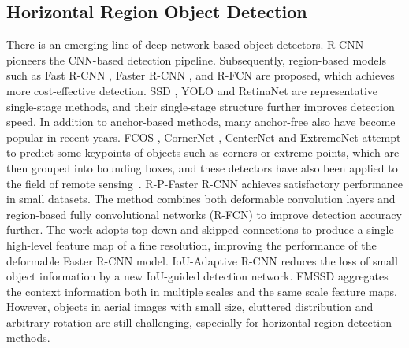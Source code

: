 \documentclass[10pt,journal,compsoc]{IEEEtran}
\begin{document}
\subsection{Horizontal Region Object Detection}
There is an emerging line of deep network based object detectors. R-CNN \cite{girshick2014rich} pioneers the CNN-based detection pipeline. Subsequently, region-based models such as Fast R-CNN \cite{girshick2015fast}, Faster R-CNN \cite{ren2017faster}, and R-FCN \cite{dai2016r} are proposed, which achieves more cost-effective detection. SSD \cite{liu2016ssd}, YOLO \cite{redmon2016you} and RetinaNet \cite{lin2017focal} are representative single-stage methods, and their single-stage structure further improves detection speed. In addition to anchor-based methods, many anchor-free also have become popular in recent years. FCOS \cite{tian2019fcos}, CornerNet \cite{law2018cornernet}, CenterNet \cite{duan2019centernet} and ExtremeNet \cite{zhou2019bottom} attempt to predict some keypoints of objects such as corners or extreme points, which are then grouped into bounding boxes, and these detectors have also been applied to the field of remote sensing~\cite{wei2020oriented,xiao2020axis}. R-P-Faster R-CNN \cite{han2017efficient} achieves satisfactory performance in small datasets. The method \cite{xu2017deformable} combines both deformable convolution layers \cite{dai2017deformable} and region-based fully convolutional networks (R-FCN) to improve detection accuracy further. The work \cite{ren2018deformable} adopts top-down and skipped connections to produce a single high-level feature map of a fine resolution, improving the performance of the deformable Faster R-CNN model. IoU-Adaptive R-CNN \cite{yan2019iou} reduces the loss of small object information by a new IoU-guided detection network. FMSSD \cite{wang2019fmssd} aggregates the context information both in multiple scales and the same scale feature maps. However, objects in aerial images with small size, cluttered distribution and arbitrary rotation are still challenging, especially for horizontal region detection methods.
\end{document}
